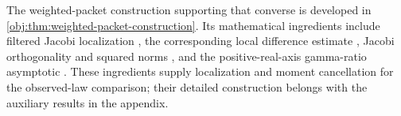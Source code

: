 The weighted-packet construction supporting that converse is developed in \cref{obj:thm:weighted-packet-construction}. Its mathematical ingredients include filtered Jacobi localization \citep[Theorem 2.4, equation (2.14)]{PetrushevXu2005}, the corresponding local difference estimate \citep[Theorem 2.2, equation (2.4)]{https://people.math.sc.edu/pencho/Publications/kpx-06-28-06-web.pdf}, Jacobi orthogonality and squared norms \citep[Table 18.3.1, Jacobi row and caption]{https://dlmf.nist.gov/18.3}, and the positive-real-axis gamma-ratio asymptotic \citep[equation (5.11.12)]{https://dlmf.nist.gov/5.11.E12}. These ingredients supply localization and moment cancellation for the observed-law comparison; their detailed construction belongs with the auxiliary results in the appendix.
